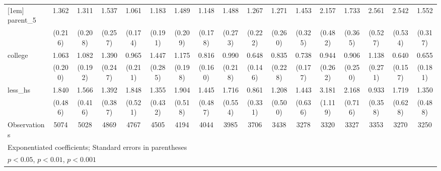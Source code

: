 {\begin{tabular}{l*{16}{c}}
[1em]
parent\_5            &       1.362         &       1.311         &       1.537\sym{*}  &       1.061         &       1.183         &       1.489\sym{**} &       1.148         &       1.488\sym{*}  &       1.267         &       1.271         &       1.453         &       2.157\sym{***}&       1.733\sym{**} &       2.561\sym{***}&       2.542\sym{***}&       1.552\sym{*}  \\
                    &     (0.216)         &     (0.208)         &     (0.257)         &     (0.174)         &     (0.191)         &     (0.209)         &     (0.178)         &     (0.273)         &     (0.222)         &     (0.260)         &     (0.325)         &     (0.482)         &     (0.365)         &     (0.527)         &     (0.534)         &     (0.317)         \\
[1em]
college             &       1.063         &       1.082         &       1.390         &       0.965         &       1.447         &       1.175         &       0.816         &       0.990         &       0.648         &       0.835         &       0.738         &       0.944         &       0.906         &       1.138         &       0.640         &       0.655         \\
                    &     (0.200)         &     (0.192)         &     (0.247)         &     (0.211)         &     (0.285)         &     (0.198)         &     (0.160)         &     (0.218)         &     (0.146)         &     (0.228)         &     (0.177)         &     (0.262)         &     (0.250)         &     (0.271)         &     (0.157)         &     (0.181)         \\
[1em]
less\_hs             &       1.840\sym{*}  &       1.566         &       1.392         &       1.848\sym{*}  &       1.355         &       1.904\sym{*}  &       1.445         &       1.716         &       0.861         &       1.208         &       1.443         &       3.181\sym{**} &       2.168\sym{*}  &       0.933         &       1.719         &       1.350         \\
                    &     (0.486)         &     (0.416)         &     (0.387)         &     (0.521)         &     (0.432)         &     (0.518)         &     (0.487)         &     (0.554)         &     (0.331)         &     (0.500)         &     (0.636)         &     (1.119)         &     (0.716)         &     (0.358)         &     (0.628)         &     (0.488)         \\
\hline
Observations        &        5074         &        5028         &        4869         &        4767         &        4505         &        4194         &        4044         &        3985         &        3706         &        3438         &        3278         &        3320         &        3327         &        3353         &        3270         &        3250         \\
\hline\hline
\multicolumn{17}{l}{\footnotesize Exponentiated coefficients; Standard errors in parentheses}\\
\multicolumn{17}{l}{\footnotesize \sym{*} \(p<0.05\), \sym{**} \(p<0.01\), \sym{***} \(p<0.001\)}\\
\end{tabular}
}
